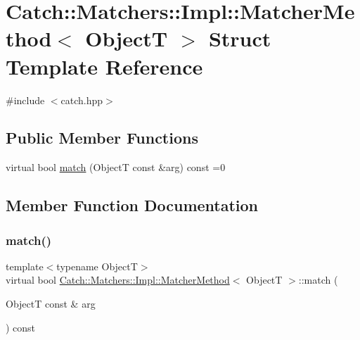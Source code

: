 \hypertarget{struct_catch_1_1_matchers_1_1_impl_1_1_matcher_method}{}\section{Catch\+:\+:Matchers\+:\+:Impl\+:\+:Matcher\+Method$<$ ObjectT $>$ Struct Template Reference}
\label{struct_catch_1_1_matchers_1_1_impl_1_1_matcher_method}


{\ttfamily \#include $<$catch.\+hpp$>$}

\subsection*{Public Member Functions}
\begin{DoxyCompactItemize}
\item 
virtual bool \mbox{\hyperlink{struct_catch_1_1_matchers_1_1_impl_1_1_matcher_method_ae0920ff9e817acf08e1bb0cbcb044e30}{match}} (ObjectT const \&arg) const =0
\end{DoxyCompactItemize}


\subsection{Member Function Documentation}
\mbox{\label{struct_catch_1_1_matchers_1_1_impl_1_1_matcher_method_ae0920ff9e817acf08e1bb0cbcb044e30}} 
\subsubsection{\texorpdfstring{match()}{match()}}
{\footnotesize\ttfamily template$<$typename ObjectT$>$ \\
virtual bool \mbox{\hyperlink{struct_catch_1_1_matchers_1_1_impl_1_1_matcher_method}{Catch\+::\+Matchers\+::\+Impl\+::\+Matcher\+Method}}$<$ ObjectT $>$\+::match (\begin{DoxyParamCaption}\item[{ObjectT const \&}]{arg }\end{DoxyParamCaption}) const\hspace{0.3cm}{\ttfamily [pure virtual]}}



